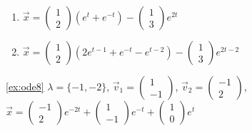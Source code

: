\documentclass[a4paper,10pt]{book}
\begin{document}
\begin{enumerate}[label=\alph*), itemsep=-3pt, topsep=-7pt]
  \item $\vec{x}=\left(\begin{smallmatrix} 1\\ 2 \end{smallmatrix} \right)\left(e^{t}+e^{-t}\right)
               -\left(\begin{smallmatrix} 1\\ 3 \end{smallmatrix} \right)e^{2t}$
  \item $\vec{x}=\left(\begin{smallmatrix} 1\\ 2 \end{smallmatrix} \right)\left(2e^{t-1}+e^{-t}-e^{t-2}\right)
               -\left(\begin{smallmatrix} 1\\ 3 \end{smallmatrix} \right)e^{2t-2}$
\end{enumerate}
               
\ref{ex:ode8} $\lambda=\{-1,-2\}$, 
              $\vec{v}_1=\left(\begin{smallmatrix} 1\\ -1 \end{smallmatrix} \right)$, 
              $\vec{v}_2=\left(\begin{smallmatrix} -1\\ 2 \end{smallmatrix} \right)$, 
              $\vec{x}=\left(\begin{smallmatrix} -1\\ 2 \end{smallmatrix} \right)e^{-2t}
               +\left(\begin{smallmatrix} 1\\ -1 \end{smallmatrix} \right)e^{-t}
               +\left(\begin{smallmatrix} 1\\ 0 \end{smallmatrix} \right)e^{t}$
               
\end{document}
